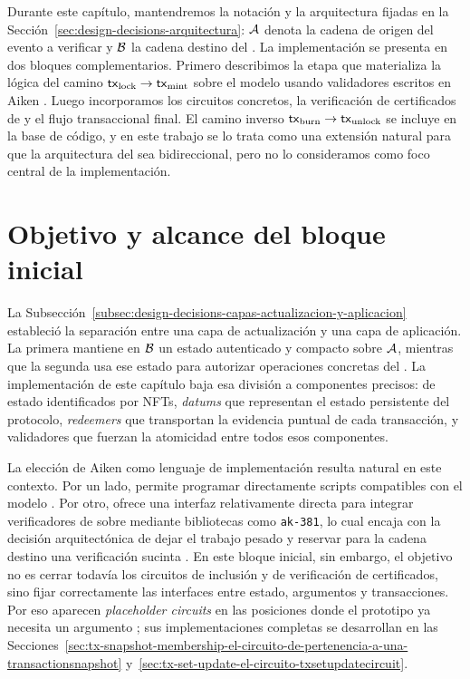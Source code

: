 
Durante este capítulo, mantendremos la notación y la arquitectura fijadas en la Sección~\ref{sec:design-decisions-arquitectura}: $\mathcal{A}$ denota la cadena de origen del evento a verificar y $\mathcal{B}$ la cadena destino del \zkBridge. La implementación se presenta en dos bloques complementarios. Primero describimos la etapa que materializa la lógica \Onchain del camino $\mathsf{tx}_{\mathrm{lock}} \rightarrow \mathsf{tx}_{\mathrm{mint}}$ sobre el modelo \eUTxO usando validadores escritos en Aiken \cite{aiken2026, Chakravarty2020}. Luego incorporamos los circuitos \ZK concretos, la verificación de certificados de \Mithril y el flujo transaccional final. El camino inverso $\mathsf{tx}_{\mathrm{burn}} \rightarrow \mathsf{tx}_{\mathrm{unlock}}$ se incluye en la base de código, y en este trabajo se lo trata como una extensión natural para que la arquitectura del \zkBridge sea bidireccional, pero no lo consideramos como foco central de la implementación.

\section{Objetivo y alcance del bloque inicial}
\label{sec:validadores-y-flujo-transaccional-objetivo-y-alcance-del-bloque-inicial}

La Subsección~\ref{subsec:design-decisions-capas-actualizacion-y-aplicacion} estableció la separación entre una capa de actualización y una capa de aplicación. La primera mantiene en $\mathcal{B}$ un estado autenticado y compacto sobre $\mathcal{A}$, mientras que la segunda usa ese estado para autorizar operaciones concretas del \Bridge. La implementación de este capítulo baja esa división a componentes precisos: \UTxOs de estado identificados por NFTs, \textit{datums} que representan el estado persistente del protocolo, \textit{redeemers} que transportan la evidencia puntual de cada transacción, y validadores que fuerzan la atomicidad entre todos esos componentes.

La elección de Aiken como lenguaje de implementación resulta natural en este contexto. Por un lado, permite programar directamente scripts compatibles con el modelo \eUTxO. Por otro, ofrece una interfaz relativamente directa para integrar verificadores de \Groth sobre \BLS mediante bibliotecas como \texttt{ak-381}, lo cual encaja con la decisión arquitectónica de dejar el trabajo pesado \Offchain y reservar para la cadena destino una verificación sucinta \cite{CIP0381, IOGPlutusV3, AK381Repo}. En este bloque inicial, sin embargo, el objetivo no es cerrar todavía los circuitos de inclusión y de verificación de certificados, sino fijar correctamente las interfaces entre estado, argumentos y transacciones. Por eso aparecen \textit{placeholder circuits} en las posiciones donde el prototipo ya necesita un argumento \ZK; sus implementaciones completas se desarrollan en las Secciones~\ref{sec:tx-snapshot-membership-el-circuito-de-pertenencia-a-una-transactionsnapshot} y~\ref{sec:tx-set-update-el-circuito-txsetupdatecircuit}.

